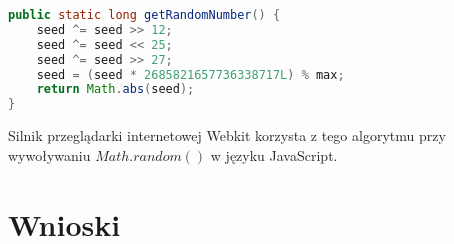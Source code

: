 \documentclass[a4paper, 11pt]{article} %
\begin{document}
\begin{lstlisting}[style=mystyle, language=java, frame=single, caption = Generowanie następnej liczby pseudolosowej przez Xorshift]
public static long getRandomNumber() {
    seed ^= seed >> 12;
    seed ^= seed << 25;
    seed ^= seed >> 27;
    seed = (seed * 2685821657736338717L) % max;
    return Math.abs(seed);
}
\end{lstlisting}
Silnik przeglądarki internetowej Webkit korzysta z tego algorytmu przy wywoływaniu $Math.random()$ w języku JavaScript.
\section*{Wnioski}


%

%

\end{document}
